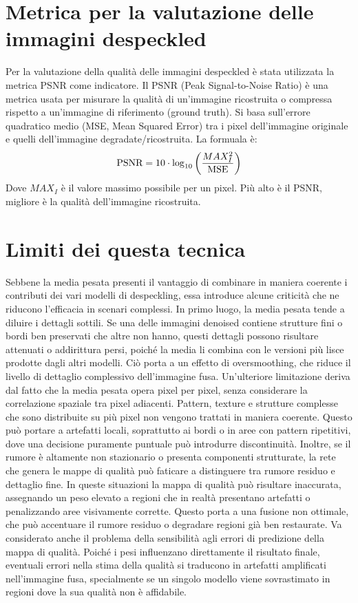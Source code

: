 \section{Metrica per la valutazione delle immagini despeckled}
Per la valutazione della qualità delle immagini despeckled è stata utilizzata la metrica PSNR come indicatore.
Il PSNR (Peak Signal-to-Noise Ratio) è una metrica usata per misurare la qualità di un’immagine ricostruita o 
compressa rispetto a un’immagine di riferimento (ground truth). 
Si basa sull’errore quadratico medio (MSE, Mean Squared Error) tra i pixel dell’immagine originale e 
quelli dell’immagine degradate/ricostruita. La formuala è: 
\begin{equation}
  \makebox[\textwidth][c]{%
    $\displaystyle
    \text{PSNR} = 10 \cdot \log_{10} \left( \frac{MAX_I^2}{\text{MSE}} \right)
    $%
  }
\end{equation}
Dove $MAX_I$ è il valore massimo possibile per un pixel. Più alto è il PSNR, migliore è la qualità dell’immagine ricostruita.
\section{Limiti dei questa tecnica}
Sebbene la media pesata presenti il vantaggio di combinare in maniera coerente i contributi dei vari modelli di despeckling, 
essa introduce alcune criticità che ne riducono l’efficacia in scenari complessi.
In primo luogo, la media pesata tende a diluire i dettagli sottili. Se una delle immagini denoised contiene strutture fini 
o bordi ben preservati che altre non hanno, questi dettagli possono risultare attenuati o addirittura persi, poiché la 
media li combina con le versioni più lisce prodotte dagli altri modelli. Ciò porta a un effetto di oversmoothing, che riduce 
il livello di dettaglio complessivo dell’immagine fusa.
Un’ulteriore limitazione deriva dal fatto che la media pesata opera pixel per pixel, senza considerare la correlazione spaziale 
tra pixel adiacenti. Pattern, texture e strutture complesse che sono distribuite su più pixel non vengono trattati in maniera 
coerente. Questo può portare a artefatti locali, soprattutto ai bordi o in aree con pattern ripetitivi, dove una decisione 
puramente puntuale può introdurre discontinuità.
Inoltre, se il rumore è altamente non stazionario o presenta componenti strutturate, la rete che genera le mappe di qualità 
può faticare a distinguere tra rumore residuo e dettaglio fine. In queste situazioni la mappa di qualità può risultare 
inaccurata, assegnando un peso elevato a regioni che in realtà presentano artefatti o penalizzando aree visivamente corrette. 
Questo porta a una fusione non ottimale, che può accentuare il rumore residuo o degradare regioni già ben restaurate.
Va considerato anche il problema della sensibilità agli errori di predizione della mappa di qualità. Poiché i pesi influenzano 
direttamente il risultato finale, eventuali errori nella stima della qualità si traducono in artefatti amplificati nell’immagine 
fusa, specialmente se un singolo modello viene sovrastimato in regioni dove la sua qualità non è affidabile.

